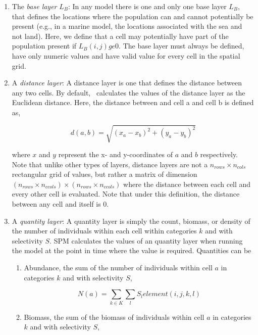 \begin{enumerate}
\item The \emph{base layer} $L_B$: In any model there is one and only one base layer $L_B$, that defines the locations where the population can and cannot potentially be present (e.g., in a marine model, the locations associated with the sea and not land). Here, we define that a cell may potentially have part of the population present if $L_B(i,j) ge 0$. The base layer must always be defined, have only numeric values and have valid value for every cell in the spatial grid.

\item A \emph{distance layer}: A distance layer is one that defines the distance between any two cells. By default, \SPM\ calculates the values of the distance layer as the Euclidean distance. Here, the distance between and cell a and cell b is defined as,

\[
d\left( {a,b} \right) = \sqrt {\left( {x_a  - x_b } \right)^2  + \left( {y_a  - y_b } \right)^2 } 
\]

where $x$ and $y$ represent the x- and y-coordinates of $a$ and $b$ respectively. Note that unlike other types of layers, distance layers are not a $n_{rows} \times n_{cols}$ rectangular grid of values, but rather a matrix of dimension $(n_{rows} \times n_{ccols}) \times (n_{rows} \times n_{ccols})$  where the distance between each cell and every other cell is evaluated. Note that under this definition, the distance between any cell and itself is 0.

\item A \emph{quantity layer}: A quantity layer is simply the count, biomass, or density of the number of individuals within each cell within categories $k$ and with selectivity $S$. SPM calculates the values of an quantity layer when running the model at the point in time where the value is required. Quantities can be 

\begin{enumerate}

\item Abundance, the sum of the number of individuals within cell $a$ in categories $k$ and with selectivity $S$,

\[
N\left( a \right) = \sum\limits_{k \in K} {\sum\limits_l {S_l element\left( {i,j,k,l} \right)} } 
\]

\item Biomass, the sum of the biomass of individuals within cell $a$ in categories $k$ and with selectivity $S$,


\end{enumerate}
\end{enumerate}
